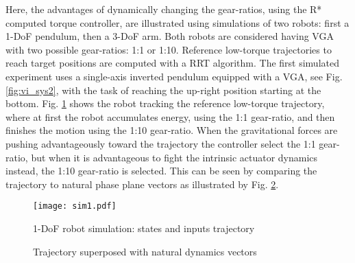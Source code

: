 Here, the advantages of dynamically changing the gear-ratios, using the R* computed torque controller, are illustrated using simulations of two robots: first a 1-DoF pendulum, then a 3-DoF arm. Both robots are considered having VGA with two possible gear-ratios: 1:1 or 1:10. Reference low-torque trajectories to reach target positions are computed with a RRT algorithm. 
%
The first simulated experiment uses a single-axis inverted pendulum equipped with a VGA, see Fig. \ref{fig:vi_sys2}, with the task of reaching the up-right position starting at the bottom. Fig. \ref{fig:sim1} shows the robot tracking the reference low-torque trajectory, where at first the robot accumulates energy, using the 1:1 gear-ratio, and then finishes the motion using the 1:10 gear-ratio. When the gravitational forces are pushing advantageously toward the trajectory the controller select the 1:1 gear-ratio, but when it is advantageous to fight the intrinsic actuator dynamics instead, the 1:10 gear-ratio is selected. This can be seen by comparing the trajectory to natural phase plane vectors as illustrated by Fig. \ref{fig:pps}.
%
\begin{figure}[htp]
	\centering
		\texttt{[image: sim1.pdf]}
	\caption{1-DoF robot simulation: states and inputs trajectory}
	\label{fig:sim1}
\end{figure}
%
%
\begin{figure}[htp]
				\vspace{-10pt}
        \centering
        \caption{Trajectory superposed with natural dynamics vectors}
				\label{fig:pps}
\end{figure}

%

